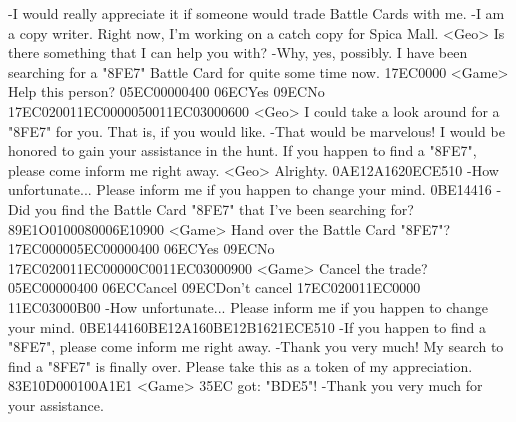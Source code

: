 -I would really appreciate it if someone would trade Battle Cards with me. 
-I am a copy writer. 
Right now, I'm working on a catch copy for Spica Mall. 
<Geo> Is there something that I can help you with? 
-Why, yes, possibly. 
I have been searching for a "{8F}{E7}" Battle Card for quite some time now. 
{17}{EC}{00}{00} 
<Game> Help this person? {05}{EC}{00}{00}{04}{00}  {06}{EC}Yes   {09}{EC}No 
{17}{EC}{02}{00}{11}{EC}{00}{00}{05}{00}{11}{EC}{03}{00}{06}{00}
<Geo> I could take a look around for a "{8F}{E7}" for you. That is, if you would like. 
-That would be marvelous! 
I would be honored to gain your assistance in the hunt. 
If you happen to find a "{8F}{E7}", please come inform me right away. 
<Geo> Alrighty. 
{0A}{E1}{2A}{16}{20}{EC}{E5}{10}
-How unfortunate... 
Please inform me if you happen to change your mind. 
{0B}{E1}{44}{16}
-Did you find the Battle Card "{8F}{E7}" that I've been searching for? 
{89}{E1}O{01}{00}{08}{00}{06}{E1}{09}{00}
<Game> Hand over the Battle Card "{8F}{E7}"? 
{17}{EC}{00}{00}{05}{EC}{00}{00}{04}{00}  {06}{EC}Yes   {09}{EC}No 
{17}{EC}{02}{00}{11}{EC}{00}{00}{0C}{00}{11}{EC}{03}{00}{09}{00}
<Game> Cancel the trade? {05}{EC}{00}{00}{04}{00}  {06}{EC}Cancel   {09}{EC}Don't cancel 
{17}{EC}{02}{00}{11}{EC}{00}{00} {11}{EC}{03}{00}{0B}{00}
-How unfortunate... 
Please inform me if you happen to change your mind. 
{0B}{E1}{44}{16}{0B}{E1}{2A}{16}{0B}{E1}{2B}{16}{21}{EC}{E5}{10}
-If you happen to find a "{8F}{E7}", please come inform me right away. 
-Thank you very much! 
My search to find a "{8F}{E7}" is finally over. 
Please take this as a token of my appreciation. 
{83}{E1}{0D}{00}{01}{00}{A1}{E1} 
<Game> {35}{EC} got: "{BD}{E5}"! 
-Thank you very much for your assistance. 
